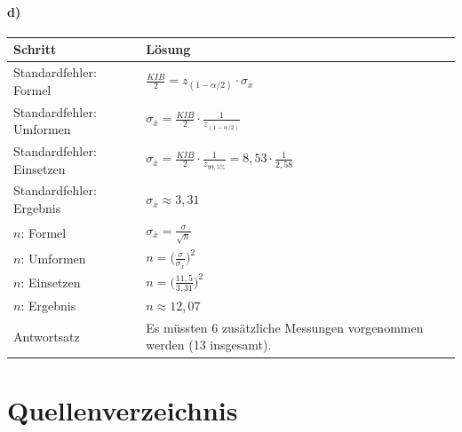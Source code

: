 \documentclass[
  11pt,
  ngerman,
  a4paper,
]{report}
\begin{document}
\hypertarget{d-7}{%
\subsubsection{d)}\label{d-7}}

\begin{table}[H]
\centering
\begin{tabular}{ll}
\toprule
\textbf{Schritt} & \textbf{Lösung}\\
\midrule
Standardfehler: Formel & $\frac{\mathit{KIB}}{2} = z_{(1-\alpha/2)} \cdot \sigma_{\bar{x}}$\\
Standardfehler: Umformen & $\sigma_{\bar{x}} = \frac{\mathit{KIB}}{2} \cdot \frac{1}{z_{(1-\alpha/2)}}$\\
Standardfehler: Einsetzen & $\sigma_{\bar{x}}=\frac{\mathit{KIB}}{2}\cdot \frac{1}{z_{99{,}5\%}} = 8{,}53 \cdot \frac{1}{2{,}58}$\\
Standardfehler: Ergebnis & $\sigma_{\bar{x}} \approx 3{,}31$\\
$n$: Formel & $\sigma_{\bar{x}}=\frac{\sigma}{\sqrt{n}}$\\
$n$: Umformen & $n=\Big(\frac{\sigma}{\sigma_{\bar{x}}}\Big)^2$\\
$n$: Einsetzen & $n=\Big(\frac{11{,}5}{3{,}31}\Big)^2$\\
$n$: Ergebnis & $n\approx12{,}07$\\
Antwortsatz & Es müssten 6 zusätzliche Messungen  vorgenommen werden (13 insgesamt).\\
\bottomrule
\end{tabular}
\end{table}

\hypertarget{quellenverzeichnis}{%
\chapter*{Quellenverzeichnis}\label{quellenverzeichnis}}
\end{document}
